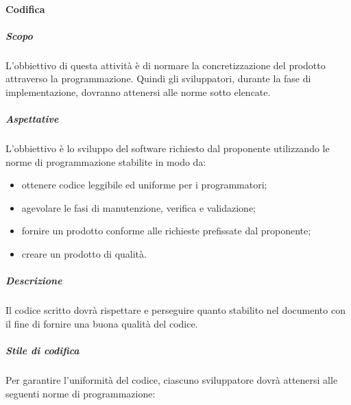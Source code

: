 			\paragraph{Codifica}
				\subparagraph{Scopo}
					L'obbiettivo di questa attività è di normare la concretizzazione del prodotto attraverso la programmazione. Quindi gli sviluppatori, durante la fase di implementazione, dovranno attenersi alle norme sotto elencate.
				\subparagraph{Aspettative}
					 L’obbiettivo è lo sviluppo del software richiesto dal proponente utilizzando le norme di programmazione stabilite in modo da:
					 	\begin{itemize}
					 	\item ottenere codice leggibile ed uniforme per i programmatori;
						\item agevolare le fasi di manutenzione, verifica e validazione;
						\item fornire un prodotto conforme alle richieste prefissate dal proponente;
						\item creare un prodotto di qualità.
					 \end{itemize}
				 \subparagraph{Descrizione}
				 	Il codice scritto dovrà rispettare e perseguire quanto stabilito nel documento  con il fine di fornire una buona qualità del codice.
				 \subparagraph{Stile di codifica}
				 	Per garantire l'uniformità del codice, ciascuno sviluppatore dovrà attenersi alle seguenti norme di programmazione:
